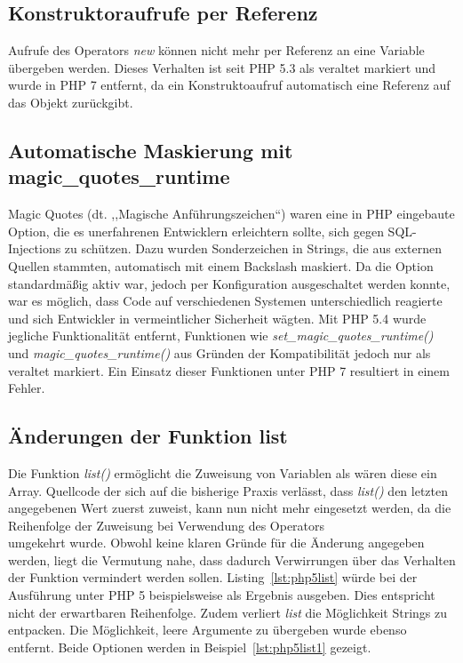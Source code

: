     \subsection{Konstruktoraufrufe per Referenz}
    Aufrufe des Operators \textit{new} können nicht mehr per Referenz an eine Variable übergeben werden. Dieses Verhalten ist seit \ac{PHP} 5.3 als veraltet 
    markiert und wurde in \ac{PHP} 7 entfernt, da ein Konstruktoaufruf automatisch eine Referenz auf das Objekt zurückgibt.\cite{php_group_php:_nodate-5}

    \subsection{Automatische Maskierung mit magic\_quotes\_runtime}\label{php5magicquotes}
    Magic Quotes (dt. ,,Magische Anführungszeichen``) waren eine in \ac{PHP} eingebaute Option, die es unerfahrenen Entwicklern 
    erleichtern sollte, sich gegen SQL-Injections zu schützen. Dazu wurden Sonderzeichen in Strings, die aus externen Quellen 
    stammten, automatisch mit einem Backslash maskiert. Da die Option standardmäßig aktiv war, jedoch per Konfiguration 
    ausgeschaltet werden konnte, war es möglich, dass Code auf verschiedenen Systemen unterschiedlich reagierte und sich 
    Entwickler in vermeintlicher Sicherheit wägten.\cite{php_group_php:_nodate-4} Mit \ac{PHP} 5.4 wurde jegliche Funktionalität entfernt, Funktionen wie 
    \textit{set\_magic\_quotes\_runtime()} und \textit{magic\_quotes\_runtime()} aus Gründen der Kompatibilität jedoch 
    nur als veraltet markiert. Ein Einsatz dieser Funktionen unter \ac{PHP} 7 resultiert in einem Fehler. 
    
    \subsection{Änderungen der Funktion list}\label{php5listChanges}
    Die Funktion \textit{list()} ermöglicht die Zuweisung von Variablen als wären diese ein Array. Quellcode der sich auf die bisherige Praxis verlässt, dass \textit{list()}
    den letzten angegebenen Wert zuerst zuweist, kann nun nicht mehr eingesetzt werden, da die Reihenfolge der Zuweisung bei Verwendung des Operators \textit{\[\]} umgekehrt wurde. 
    Obwohl keine klaren Gründe für die Änderung angegeben werden, liegt die Vermutung nahe, dass dadurch Verwirrungen über das Verhalten der Funktion vermindert werden sollen. 
    Listing~\ref{lst:php5list} würde bei der Ausführung unter \acs{PHP} 5 beispielsweise \grqq{} als Ergebnis ausgeben. Dies entspricht nicht der erwartbaren Reihenfolge.
    Zudem verliert \textit{list} die Möglichkeit Strings zu entpacken. Die Möglichkeit, leere Argumente zu übergeben wurde ebenso entfernt. Beide Optionen werden in 
    Beispiel~\ref{lst:php5list1} gezeigt.

